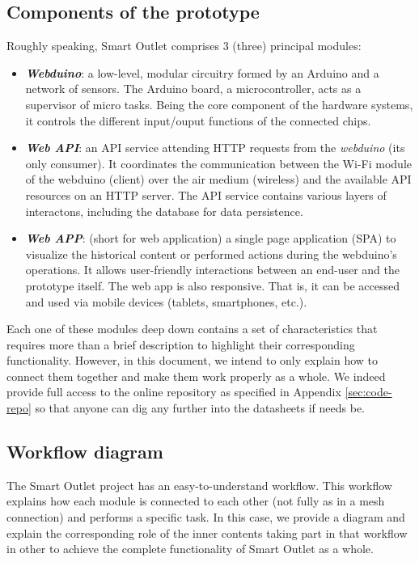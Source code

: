 \subsection{Components of the prototype}
Roughly speaking, Smart Outlet comprises 3 (three) principal modules:
\begin{itemize}
    \item \textbf{\textit{Webduino}}: a low-level, modular circuitry formed by an Arduino and a network of sensors. The Arduino board, a microcontroller, acts as a supervisor of micro tasks. Being the core component of the hardware systems, it controls the different input/ouput functions of the connected chips.
    \item \textbf{\textit{Web API}}: an API service attending HTTP requests from the \emph{webduino} (its only consumer). It coordinates the communication between the Wi-Fi module of the webduino (client) over the air medium (wireless) and the available API resources on an HTTP server. The API service contains various layers of interactons, including the database for data persistence.
    \item \textbf{\textit{Web APP}}: (short for web application) a single page application (SPA) to visualize the historical content or performed actions during the webduino's operations. It allows user-friendly interactions between an end-user and the prototype itself. The web app is also responsive. That is, it can be accessed and used via mobile devices (tablets, smartphones, etc.).
\end{itemize}

Each one of these modules deep down contains a set of characteristics that requires more than a brief description to highlight their corresponding functionality. However, in this document, we intend to only explain how to connect them together and make them work properly as a whole. We indeed provide full access to the online repository as specified in Appendix \ref{sec:code-repo} so that anyone can dig any further into the datasheets if needs be.

\subsection{Workflow diagram}
The Smart Outlet project has an easy-to-understand workflow. This workflow explains how each module is connected to each other (not fully as in a mesh connection) and performs a specific task. In this case, we provide a diagram and explain the corresponding role of the inner contents taking part in that workflow in other to achieve the complete functionality of Smart Outlet as a whole.

